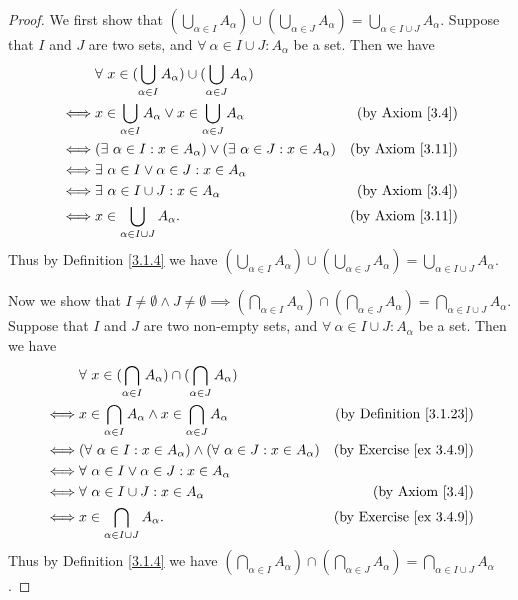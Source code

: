 \begin{proof}
We first show that \((\bigcup_{\alpha \in I} A_{\alpha}) \cup (\bigcup_{\alpha \in J} A_{\alpha}) = \bigcup_{\alpha \in I \cup J} A_{\alpha}\).
Suppose that \(I\) and \(J\) are two sets, and \(\forall\ \alpha \in I \cup J : A_{\alpha}\) be a set.
Then we have
\begin{align*}
& \forall\ x \in (\bigcup_{\alpha \in I} A_{\alpha}) \cup (\bigcup_{\alpha \in J} A_{\alpha}) \\
\iff & x \in \bigcup_{\alpha \in I} A_{\alpha} \lor x \in \bigcup_{\alpha \in J} A_{\alpha} & \text{(by Axiom \ref{3.4})} \\
\iff & (\exists\ \alpha \in I : x \in A_{\alpha}) \lor (\exists\ \alpha \in J : x \in A_{\alpha}) & \text{(by Axiom \ref{3.11})} \\
\iff & \exists\ \alpha \in I \lor \alpha \in J : x \in A_{\alpha} \\
\iff & \exists\ \alpha \in I \cup J : x \in A_{\alpha} & \text{(by Axiom \ref{3.4})} \\
\iff & x \in \bigcup_{\alpha \in I \cup J} A_{\alpha}. & \text{(by Axiom \ref{3.11})}
\end{align*}
Thus by Definition \ref{3.1.4} we have \((\bigcup_{\alpha \in I} A_{\alpha}) \cup (\bigcup_{\alpha \in J} A_{\alpha}) = \bigcup_{\alpha \in I \cup J} A_{\alpha}\).

Now we show that \(I \neq \emptyset \land J \neq \emptyset \implies (\bigcap_{\alpha \in I} A_{\alpha}) \cap (\bigcap_{\alpha \in J} A_{\alpha}) = \bigcap_{\alpha \in I \cup J} A_{\alpha}\).
Suppose that \(I\) and \(J\) are two non-empty sets, and \(\forall\ \alpha \in I \cup J : A_{\alpha}\) be a set.
Then we have
\begin{align*}
& \forall\ x \in (\bigcap_{\alpha \in I} A_{\alpha}) \cap (\bigcap_{\alpha \in J} A_{\alpha}) \\
\iff & x \in \bigcap_{\alpha \in I} A_{\alpha} \land x \in \bigcap_{\alpha \in J} A_{\alpha} & \text{(by Definition \ref{3.1.23})} \\
\iff & (\forall\ \alpha \in I : x \in A_{\alpha}) \land (\forall\ \alpha \in J : x \in A_{\alpha}) & \text{(by Exercise \ref{ex 3.4.9})} \\
\iff & \forall\ \alpha \in I \lor \alpha \in J : x \in A_{\alpha} \\
\iff & \forall\ \alpha \in I \cup J : x \in A_{\alpha} & \text{(by Axiom \ref{3.4})} \\
\iff & x \in \bigcap_{\alpha \in I \cup J} A_{\alpha}. & \text{(by Exercise \ref{ex 3.4.9})}
\end{align*}
Thus by Definition \ref{3.1.4} we have \((\bigcap_{\alpha \in I} A_{\alpha}) \cap (\bigcap_{\alpha \in J} A_{\alpha}) = \bigcap_{\alpha \in I \cup J} A_{\alpha}\).
\end{proof}

